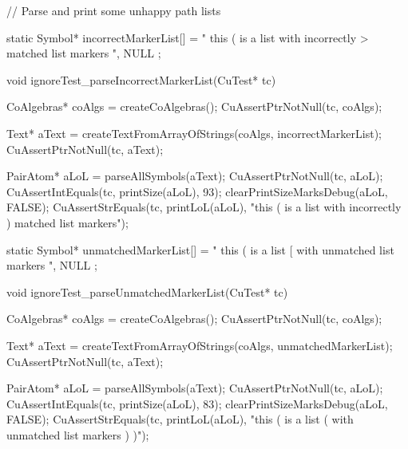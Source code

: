 // Parse and print some unhappy path lists

static Symbol* incorrectMarkerList[] = {
  " this ( is a list with incorrectly > matched list markers ",
  NULL
};

void ignoreTest_parseIncorrectMarkerList(CuTest* tc) {
  CoAlgebras* coAlgs = createCoAlgebras();
  CuAssertPtrNotNull(tc, coAlgs);

  Text* aText = createTextFromArrayOfStrings(coAlgs, incorrectMarkerList);
  CuAssertPtrNotNull(tc, aText);

  PairAtom* aLoL = parseAllSymbols(aText);
  CuAssertPtrNotNull(tc, aLoL);
  CuAssertIntEquals(tc, printSize(aLoL), 93);
  clearPrintSizeMarksDebug(aLoL, FALSE);
  CuAssertStrEquals(tc, printLoL(aLoL),
    "this ( is a list with incorrectly ) matched list markers");
}

static Symbol* unmatchedMarkerList[] = {
  " this ( is a list [ with unmatched list markers ",
  NULL
};

void ignoreTest_parseUnmatchedMarkerList(CuTest* tc) {
  CoAlgebras* coAlgs = createCoAlgebras();
  CuAssertPtrNotNull(tc, coAlgs);

  Text* aText = createTextFromArrayOfStrings(coAlgs, unmatchedMarkerList);
  CuAssertPtrNotNull(tc, aText);

  PairAtom* aLoL = parseAllSymbols(aText);
  CuAssertPtrNotNull(tc, aLoL);
  CuAssertIntEquals(tc, printSize(aLoL), 83);
  clearPrintSizeMarksDebug(aLoL, FALSE);
  CuAssertStrEquals(tc, printLoL(aLoL),
    "this ( is a list ( with unmatched list markers ) )");
}
\stoptyping